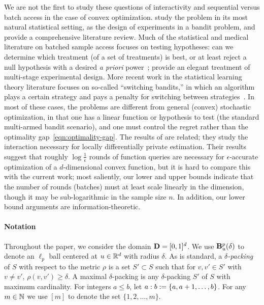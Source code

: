 We are not the first to study these questions of interactivity and
sequential versus batch access in the case of convex optimization.
\citet{PerchetRiChSn16} study the problem in its most natural statistical
setting, as the design of experiments in a bandit problem, and provide a
comprehensive literature review. Much of the statistical and medical
literature on batched sample access focuses on testing hypotheses: can we
determine which treatment (of a set of treatments) is best, or at least
reject a null hypothesis with a desired \emph{a priori}
power~\citep{Dantzig40, Stein45}; \citet{HardwickSt02} provide an elegant
treatment of multi-stage experimental design. More recent work in the
statistical learning theory literature focuses on so-called ``switching
bandits,'' in which an algorithm plays a certain strategy and pays a penalty
for switching between strategies~\citep{CesaBianchiDeSh13,
  CesaBianchiGeMa13}. In most of these cases, the problems are different
from general (convex) stochastic optimization, in that one has a linear
function or hypothesis to test (the standard multi-armed bandit scenario),
and one must control the regret rather than the optimality
gap~\eqref{eqn:optimality-gap}.  The results of \citet{SmithThUp17} are
related; they study the interaction necessary for locally differentially
private estimation. Their results suggest that roughly $\log
\frac{1}{\epsilon}$ rounds of function queries are necessary for
$\epsilon$-accurate optimization of a $d$-dimensional convex function, but
it is hard to compare this with the current work; most saliently, our lower
and upper bounds indicate that the number of rounds (batches) must at least
scale linearly in the dimension, though it may be sub-logarithmic in the
sample size $n$. In addition, our lower bound arguments are
information-theoretic.

\paragraph{Notation}
Throughout the paper, we consider the domain $\mathbf{D} = [0, 1]^d$.  We use
$\mathbf{B}^p_{u}({\delta})$ to denote an $\ell_p$ ball centered at $u \in
\mathbb{R}^d$ with radius $\delta$. As is standard, a
\emph{$\delta$-packing} of $S$ with respect to the metric $\rho$ is a set
$S' \subset S$ such that for $v, v' \in S'$ with $v \neq v'$, $\rho(v, v')
\ge \delta$.  A maximal $\delta$-packing is any $\delta$-packing $S'$ of $S$
with maximum cardinality. For integers $a \leq b$, let $a:b := \{a, a +
1, \ldots, b\}$.  
For any $m \in \mathbb{N}$ we use $[m]$ to denote 
the set $\{1, 2, \ldots, m\}$.
